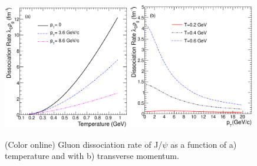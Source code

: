 \documentclass[aps,prc,preprint,superscriptaddress,showpacs,showkeys]{revtex4-1}
\begin{document}
\begin{figure}
\includegraphics[width=0.49\textwidth]{Fig3a_DRateVsT.eps}
\includegraphics[width=0.49\textwidth]{Fig3b_DRateVsPt.eps}
\caption{(Color online) Gluon dissociation rate of J/$\psi$ as a function of a) temperature and with b) transverse momentum.}
\label{fig:DRateVsTempAndPt}
\end{figure}
\end{document}
